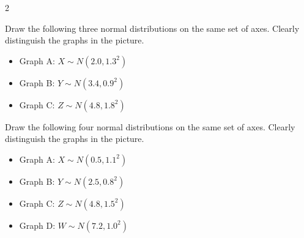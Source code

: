 \begin{multicols}{2}
		
		\vspace{-0.35cm}
		Draw the following three normal distributions on the same set of axes. Clearly distinguish the graphs in the picture.
		\begin{itemize}
			\item Graph A: $X\sim N(2.0,1.3^2)$
			\item Graph B: $Y\sim N(3.4,0.9^2)$
			\item Graph C: $Z\sim N(4.8,1.8^2)$
		\end{itemize}
		
		\vspace{-0.35cm}
		Draw the following four normal distributions on the same set of axes. Clearly distinguish the graphs in the picture.
		\begin{itemize}
			\item Graph A: $X\sim N(0.5,1.1^2)$
			\item Graph B: $Y\sim N(2.5,0.8^2)$
			\item Graph C: $Z\sim N(4.8,1.5^2)$
			\item Graph D: $W\sim N(7.2,1.0^2)$
		\end{itemize}
		
		
	\end{multicols}
	

